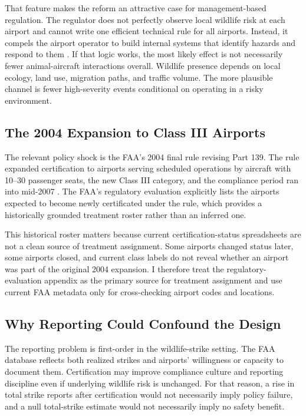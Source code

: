 \documentclass[12pt]{article}
\begin{document}
That feature makes the reform an attractive case for management-based regulation. The regulator does not perfectly observe local wildlife risk at each airport and cannot write one efficient technical rule for all airports. Instead, it compels the airport operator to build internal systems that identify hazards and respond to them \citep{Coglianese_2003}. If that logic works, the most likely effect is not necessarily fewer animal-aircraft interactions overall. Wildlife presence depends on local ecology, land use, migration paths, and traffic volume. The more plausible channel is fewer high-severity events conditional on operating in a risky environment.

\subsection{The 2004 Expansion to Class III Airports}

The relevant policy shock is the FAA's 2004 final rule revising Part 139. The rule expanded certification to airports serving scheduled operations by aircraft with 10--30 passenger seats, the new Class III category, and the compliance period ran into mid-2007 \citep{faa_reg_eval_2004}. The FAA's regulatory evaluation explicitly lists the airports expected to become newly certificated under the rule, which provides a historically grounded treatment roster rather than an inferred one.

This historical roster matters because current certification-status spreadsheets are not a clean source of treatment assignment. Some airports changed status later, some airports closed, and current class labels do not reveal whether an airport was part of the original 2004 expansion. I therefore treat the regulatory-evaluation appendix as the primary source for treatment assignment and use current FAA metadata only for cross-checking airport codes and locations.

\subsection{Why Reporting Could Confound the Design}

The reporting problem is first-order in the wildlife-strike setting. The FAA database reflects both realized strikes and airports' willingness or capacity to document them. Certification may improve compliance culture and reporting discipline even if underlying wildlife risk is unchanged. For that reason, a rise in total strike reports after certification would not necessarily imply policy failure, and a null total-strike estimate would not necessarily imply no safety benefit.
\end{document}
